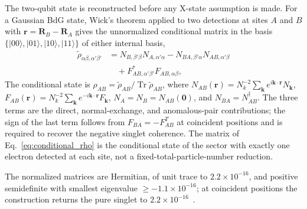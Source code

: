 \documentclass[aps,prb,twocolumn,superscriptaddress,longbibliography]{revtex4-2}
\begin{document}
The two-qubit state is reconstructed before any X-state assumption is
made. For a Gaussian BdG state, Wick's theorem applied to two
detections at sites $A$ and $B$ with
$\mathbf{r}=\mathbf{R}_{B}-\mathbf{R}_{A}$ gives the unnormalized
conditional matrix in the basis
$\{|00\rangle,|01\rangle,|10\rangle,|11\rangle\}$ of either internal
basis,
%
\begin{equation}\boxed{
\begin{aligned}
\widetilde{\rho}_{\alpha\beta,\alpha'\beta'}
&=
N_{B,\beta'\beta}N_{A,\alpha'\alpha}
- N_{BA,\beta'\alpha}N_{AB,\alpha'\beta}\\
&\quad
+ F^{*}_{AB,\alpha'\beta'}F_{AB,\alpha\beta},
\end{aligned}
}\label{eq:conditional_rho}\end{equation}
%
The conditional state is
$\rho_{AB}=\widetilde{\rho}_{AB}/\operatorname{Tr}\widetilde{\rho}_{AB}$,
where
$N_{AB}(\mathbf{r})=N_{k}^{-2}\sum_{\mathbf{k}}e^{i\mathbf{k}\cdot\mathbf{r}}N_{\mathbf{k}}$,
$F_{AB}(\mathbf{r})=N_{k}^{-2}\sum_{\mathbf{k}}e^{-i\mathbf{k}\cdot\mathbf{r}}F_{\mathbf{k}}$,
$N_{A}=N_{B}=N_{AB}(\mathbf{0})$, and
$N_{BA}=N_{AB}^{\dagger}$. The three terms are the direct,
normal-exchange, and anomalous-pair contributions; the sign of the last
term follows from $F_{BA}=-F_{AB}^{T}$ at coincident positions and is
required to recover the negative singlet coherence. The matrix of
Eq.~\eqref{eq:conditional_rho} is the conditional state of the sector
with exactly one electron detected at each site, not a
fixed-total-particle-number reduction.

The normalized matrices are Hermitian, of unit trace to
$2.2\times10^{-16}$, and positive semidefinite with smallest eigenvalue
$\ge -1.1\times10^{-16}$; at coincident positions the construction returns
the pure singlet to $2.2\times10^{-16}$~\cite{Oh2005}.
\end{document}
